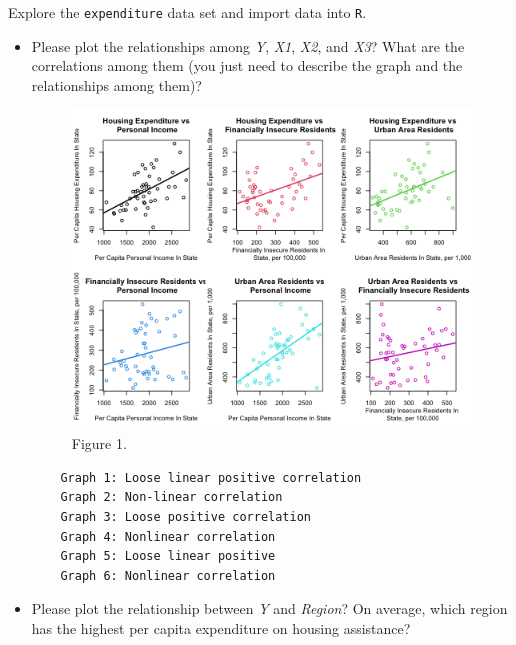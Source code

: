 \documentclass[12pt,letterpaper]{article}
\begin{document}
\vspace{.5cm}
\noindent Explore the \texttt{expenditure} data set and import data into \texttt{R}.
\vspace{.5cm}
  
\vspace{.5cm}
\begin{itemize}

\item
Please plot the relationships among \emph{Y}, \emph{X1}, \emph{X2}, and \emph{X3}? What are the correlations among them (you just need to describe the graph and the relationships among them)?

\begin{figure}[h!]\centering
	\caption{\footnotesize Figure 1.}
	\label{fig:plot_1}
	\includegraphics[width=.75\textwidth]{political_economy_scatter_plot.png}
\end{figure}



\begin{verbatim}
	Graph 1: Loose linear positive correlation
	Graph 2: Non-linear correlation
	Graph 3: Loose positive correlation 
	Graph 4: Nonlinear correlation
	Graph 5: Loose linear positive
	Graph 6: Nonlinear correlation
\end{verbatim}

\vspace{.5cm}
\item
Please plot the relationship between \emph{Y} and \emph{Region}? On average, which region has the highest per capita expenditure on housing assistance?


\end{itemize}
\end{document}
